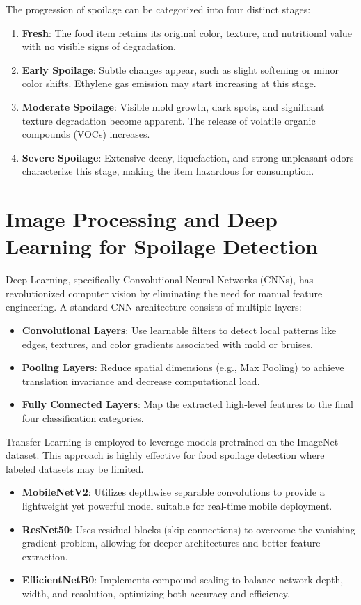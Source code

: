 The progression of spoilage can be categorized into four distinct stages:
\begin{enumerate}
    \item \textbf{Fresh}: The food item retains its original color, texture, and nutritional value with no visible signs of degradation.
    \item \textbf{Early Spoilage}: Subtle changes appear, such as slight softening or minor color shifts. Ethylene gas emission may start increasing at this stage.
    \item \textbf{Moderate Spoilage}: Visible mold growth, dark spots, and significant texture degradation become apparent. The release of volatile organic compounds (VOCs) increases.
    \item \textbf{Severe Spoilage}: Extensive decay, liquefaction, and strong unpleasant odors characterize this stage, making the item hazardous for consumption.
\end{enumerate}

\section[Image Processing and Deep Learning for Spoilage Detection]{\textbf{Image Processing and Deep Learning for Spoilage Detection}}
Deep Learning, specifically Convolutional Neural Networks (CNNs), has revolutionized computer vision by eliminating the need for manual feature engineering. A standard CNN architecture consists of multiple layers:
\begin{itemize}
    \item \textbf{Convolutional Layers}: Use learnable filters to detect local patterns like edges, textures, and color gradients associated with mold or bruises.
    \item \textbf{Pooling Layers}: Reduce spatial dimensions (e.g., Max Pooling) to achieve translation invariance and decrease computational load.
    \item \textbf{Fully Connected Layers}: Map the extracted high-level features to the final four classification categories.
\end{itemize}

Transfer Learning is employed to leverage models pretrained on the ImageNet dataset. This approach is highly effective for food spoilage detection where labeled datasets may be limited.
\begin{itemize}
    \item \textbf{MobileNetV2}: Utilizes depthwise separable convolutions to provide a lightweight yet powerful model suitable for real-time mobile deployment.
    \item \textbf{ResNet50}: Uses residual blocks (skip connections) to overcome the vanishing gradient problem, allowing for deeper architectures and better feature extraction.
    \item \textbf{EfficientNetB0}: Implements compound scaling to balance network depth, width, and resolution, optimizing both accuracy and efficiency.
\end{itemize}

